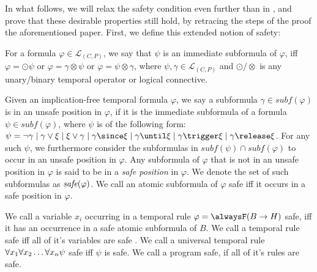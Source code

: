 In what follows, we will relax the safety condition even further than
in \cite{agcapevidi17a}, and prove that these desirable properties
still hold, by retracing the steps of the proof the aforementioned
paper. First, we define this extended notion of safety:

\begin{definition}
  For a formula $\varphi \in \mathcal{L}_{(C,P)}$, we say
  that $\psi$ is an immediate subformula of $\varphi$, iff
  $\varphi = \odot \psi$ or $\varphi = \gamma \otimes \psi$ or
  $\varphi = \psi \otimes \gamma$, where
  $\psi, \gamma \in \mathcal{L}_{(C,P)}$ and
  $\odot/\otimes$ is any unary/binary temporal operator or logical
  connective.
\end{definition}

\begin{definition}[Safety]
  Given an implication-free temporal formula $\varphi$, we say a
  subformula $\gamma \in subf(\varphi)$ is in an unsafe position in
  $\varphi$, if it is the immediate subformula of a formula
  $\psi \in subf(\varphi)$, where $\psi$ is of the following form:
  $\psi = \neg \gamma \mid \gamma \vee \xi \mid \xi \vee \gamma \mid
  \gamma \since \xi \mid \gamma \until \xi \mid \gamma \trigger \xi
  \mid \gamma \release \xi$. For any such $\psi$, we furthermore
  consider the subformulas in $subf(\psi) \cap subf(\varphi)$ to occur
  in an unsafe position in $\varphi$. Any subformula of $\varphi$ that
  is not in an unsafe position in $\varphi$ is said to be in a
  \textit{safe position} in $\varphi$. We denote the set of such
  subformulas as $\textit{safe}(\varphi)$. We call an atomic subformula of
  $\varphi$ safe iff it occurs in a safe position in $\varphi$.

  We call a variable $x_i$ occurring in a temporal rule
  $\varphi = \alwaysF(B \rightarrow H)$ safe, iff it has an occurrence
  in a safe atomic subformula of $B$. We call a temporal rule safe iff
  all of it's variables are safe . We call a universal temporal rule
  $\forall x_1 \forall x_2 \dots \forall x_n \psi$ safe iff $\psi$ is safe. We call a program safe, if
  all of it's rules are safe.
\end{definition}
